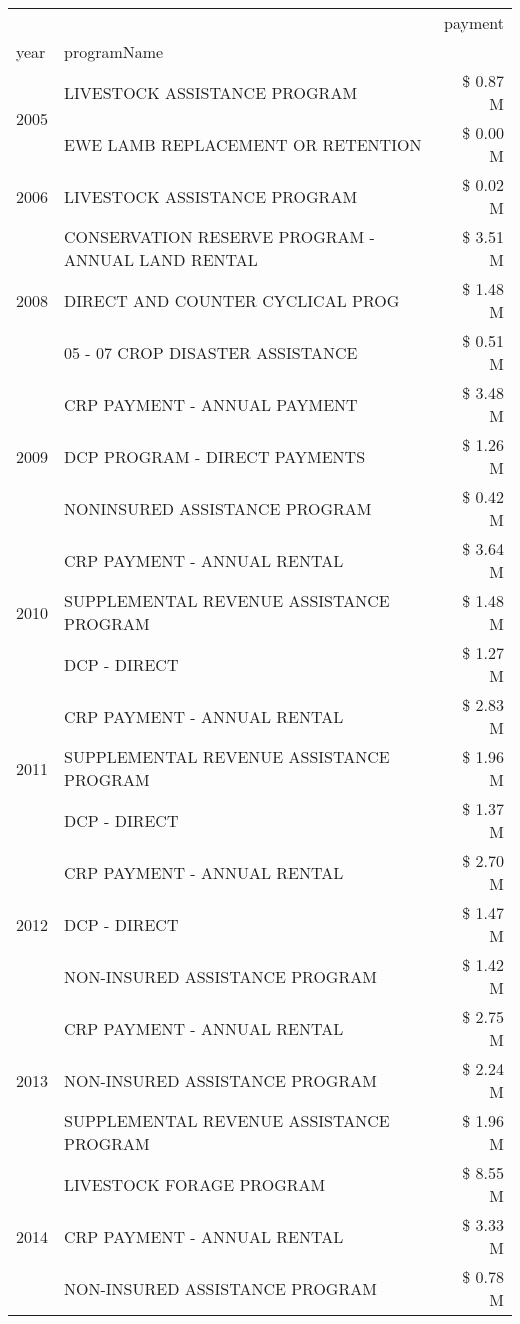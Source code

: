 \begin{tabular}{llr}
\toprule
 &  & payment \\
year & programName &  \\
\midrule
\multirow[t]{2}{*}{2005} & LIVESTOCK ASSISTANCE PROGRAM & \$ 0.87 M \\
 & EWE LAMB REPLACEMENT OR RETENTION & \$ 0.00 M \\
\cline{1-3}
2006 & LIVESTOCK ASSISTANCE PROGRAM & \$ 0.02 M \\
\cline{1-3}
\multirow[t]{3}{*}{2008} & CONSERVATION RESERVE PROGRAM - ANNUAL LAND RENTAL & \$ 3.51 M \\
 & DIRECT AND COUNTER CYCLICAL PROG & \$ 1.48 M \\
 & 05 - 07 CROP DISASTER ASSISTANCE & \$ 0.51 M \\
\cline{1-3}
\multirow[t]{3}{*}{2009} & CRP PAYMENT - ANNUAL PAYMENT & \$ 3.48 M \\
 & DCP PROGRAM - DIRECT PAYMENTS & \$ 1.26 M \\
 & NONINSURED ASSISTANCE PROGRAM & \$ 0.42 M \\
\cline{1-3}
\multirow[t]{3}{*}{2010} & CRP PAYMENT - ANNUAL RENTAL & \$ 3.64 M \\
 & SUPPLEMENTAL REVENUE ASSISTANCE PROGRAM & \$ 1.48 M \\
 & DCP - DIRECT & \$ 1.27 M \\
\cline{1-3}
\multirow[t]{3}{*}{2011} & CRP PAYMENT - ANNUAL RENTAL & \$ 2.83 M \\
 & SUPPLEMENTAL REVENUE ASSISTANCE PROGRAM & \$ 1.96 M \\
 & DCP - DIRECT & \$ 1.37 M \\
\cline{1-3}
\multirow[t]{3}{*}{2012} & CRP PAYMENT - ANNUAL RENTAL & \$ 2.70 M \\
 & DCP - DIRECT & \$ 1.47 M \\
 & NON-INSURED ASSISTANCE PROGRAM & \$ 1.42 M \\
\cline{1-3}
\multirow[t]{3}{*}{2013} & CRP PAYMENT - ANNUAL RENTAL & \$ 2.75 M \\
 & NON-INSURED ASSISTANCE PROGRAM & \$ 2.24 M \\
 & SUPPLEMENTAL REVENUE ASSISTANCE PROGRAM & \$ 1.96 M \\
\cline{1-3}
\multirow[t]{3}{*}{2014} & LIVESTOCK FORAGE PROGRAM & \$ 8.55 M \\
 & CRP PAYMENT - ANNUAL RENTAL & \$ 3.33 M \\
 & NON-INSURED ASSISTANCE PROGRAM & \$ 0.78 M \\
\cline{1-3}

\end{tabular}
